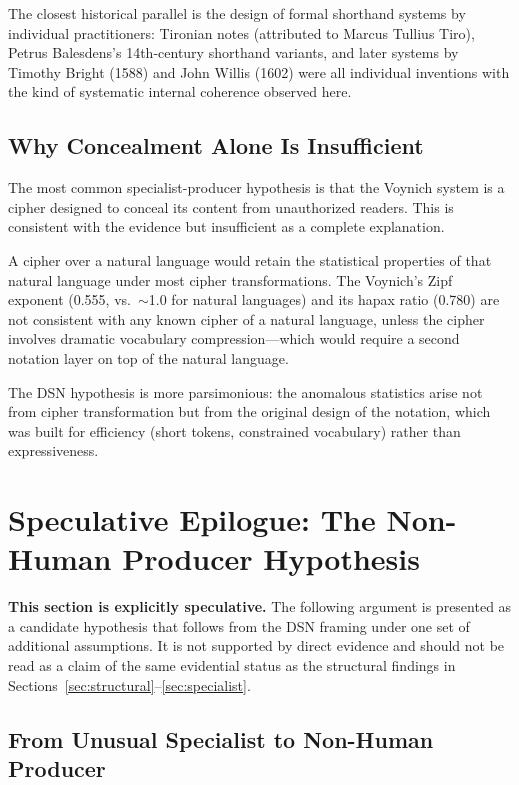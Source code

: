 \documentclass[11pt,a4paper,twocolumn]{article}
\begin{document}
The closest historical parallel is the design of formal shorthand systems by individual practitioners: Tironian notes (attributed to Marcus Tullius Tiro), Petrus Balesdens's 14th-century shorthand variants, and later systems by Timothy Bright (1588) and John Willis (1602) were all individual inventions with the kind of systematic internal coherence observed here.

\subsection{Why Concealment Alone Is Insufficient}

The most common specialist-producer hypothesis is that the Voynich system is a cipher designed to conceal its content from unauthorized readers. This is consistent with the evidence but insufficient as a complete explanation.

A cipher over a natural language would retain the statistical properties of that natural language under most cipher transformations. The Voynich's Zipf exponent (0.555, vs.\ $\sim$1.0 for natural languages) and its hapax ratio (0.780) are not consistent with any known cipher of a natural language, unless the cipher involves dramatic vocabulary compression---which would require a second notation layer on top of the natural language.

The DSN hypothesis is more parsimonious: the anomalous statistics arise not from cipher transformation but from the original design of the notation, which was built for efficiency (short tokens, constrained vocabulary) rather than expressiveness.

\section{Speculative Epilogue: The Non-Human Producer Hypothesis}
\label{sec:epilogue}

\textbf{This section is explicitly speculative.} The following argument is presented as a candidate hypothesis that follows from the DSN framing under one set of additional assumptions. It is not supported by direct evidence and should not be read as a claim of the same evidential status as the structural findings in Sections~\ref{sec:structural}--\ref{sec:specialist}.

\subsection{From Unusual Specialist to Non-Human Producer}
\end{document}
